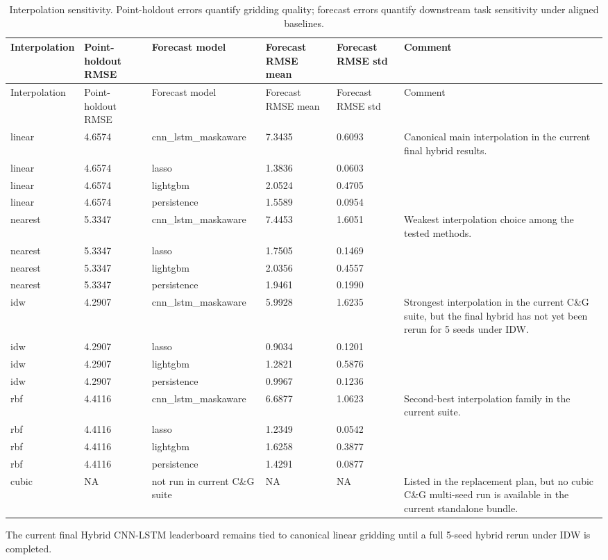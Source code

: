\documentclass[11pt]{article}
\begin{document}
\begin{landscape}

\begin{longtable}{p{1.6cm}p{1.6cm}p{2.3cm}p{1.5cm}p{1.5cm}p{6.1cm}}
\caption{Interpolation sensitivity. Point-holdout errors quantify gridding quality; forecast errors quantify downstream task sensitivity under aligned baselines.}\label{tab:t6}\\
\toprule
Interpolation & Point-holdout RMSE & Forecast model & Forecast RMSE mean & Forecast RMSE std & Comment \\
\midrule
\endfirsthead
\toprule
Interpolation & Point-holdout RMSE & Forecast model & Forecast RMSE mean & Forecast RMSE std & Comment \\
\midrule
\endhead
linear & 4.6574 & cnn\_lstm\_maskaware & 7.3435 & 0.6093 & Canonical main interpolation in the current final hybrid results. \\
linear & 4.6574 & lasso & 1.3836 & 0.0603 &  \\
linear & 4.6574 & lightgbm & 2.0524 & 0.4705 &  \\
linear & 4.6574 & persistence & 1.5589 & 0.0954 &  \\
nearest & 5.3347 & cnn\_lstm\_maskaware & 7.4453 & 1.6051 & Weakest interpolation choice among the tested methods. \\
nearest & 5.3347 & lasso & 1.7505 & 0.1469 &  \\
nearest & 5.3347 & lightgbm & 2.0356 & 0.4557 &  \\
nearest & 5.3347 & persistence & 1.9461 & 0.1990 &  \\
idw & 4.2907 & cnn\_lstm\_maskaware & 5.9928 & 1.6235 & Strongest interpolation in the current C\&G suite, but the final hybrid has not yet been rerun for 5 seeds under IDW. \\
idw & 4.2907 & lasso & 0.9034 & 0.1201 &  \\
idw & 4.2907 & lightgbm & 1.2821 & 0.5876 &  \\
idw & 4.2907 & persistence & 0.9967 & 0.1236 &  \\
rbf & 4.4116 & cnn\_lstm\_maskaware & 6.6877 & 1.0623 & Second-best interpolation family in the current suite. \\
rbf & 4.4116 & lasso & 1.2349 & 0.0542 &  \\
rbf & 4.4116 & lightgbm & 1.6258 & 0.3877 &  \\
rbf & 4.4116 & persistence & 1.4291 & 0.0877 &  \\
cubic & NA & not run in current C\&G suite & NA & NA & Listed in the replacement plan, but no cubic C\&G multi-seed run is available in the current standalone bundle. \\
\bottomrule
\end{longtable}
{\footnotesize The current final Hybrid CNN-LSTM leaderboard remains tied to canonical linear gridding until a full 5-seed hybrid rerun under IDW is completed.}

\end{landscape}
\end{document}

